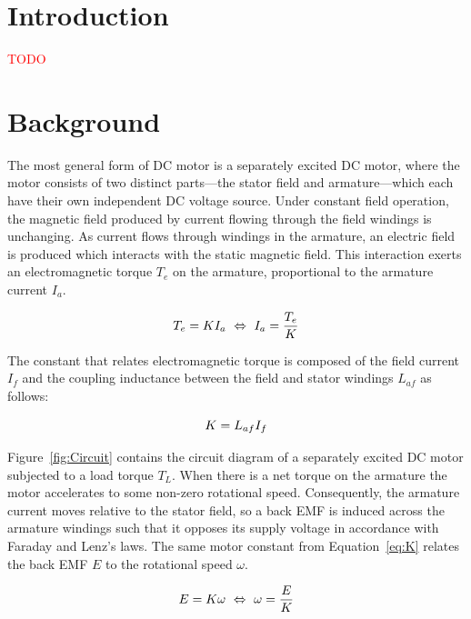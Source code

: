 \documentclass[a4paper,10pt]{article}
\begin{document}
\section{Introduction}

\textcolor{red}{TODO}

\section{Background}

The most general form of DC motor is a separately excited DC motor, where the 
motor consists of two distinct parts---the stator field and armature---which 
each have their own independent DC voltage source. Under constant field 
operation, the magnetic field produced by current flowing through the field 
windings is unchanging. As current flows through windings in the armature, an 
electric field is produced which interacts with the static magnetic field. This 
interaction exerts an electromagnetic torque $T_e$ on the armature, 
proportional to the armature current $I_a$.

\begin{equation}  \label{eq:T}
    T_e = K I_a ~\Leftrightarrow~ I_a = \frac{T_e}{K} \\
\end{equation}

The constant that relates electromagnetic torque is composed of the field 
current $I_f$ and the coupling inductance between the field and stator windings 
$L_{af}$ as follows:

\begin{equation} \label{eq:K}
    K = L_{af} I_f \\
\end{equation}

Figure~\vref{fig:Circuit} contains the circuit diagram of a separately excited 
DC motor subjected to a load torque $T_L$. When there is a net torque on the 
armature the motor accelerates to some non-zero rotational speed. Consequently, 
the armature current moves relative to the stator field, so a back EMF is 
induced across the armature windings such that it opposes its supply voltage in 
accordance with Faraday and Lenz's laws. The same motor constant from 
Equation~\ref{eq:K} relates the back EMF $E$ to the rotational speed $\omega$.

\begin{equation}  \label{eq:omega}
    E = K \omega ~\Leftrightarrow~ \omega = \frac{E}{K} \\
\end{equation}
\end{document}
